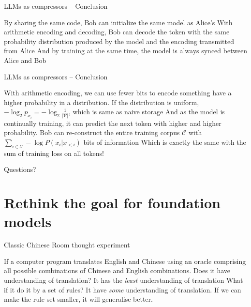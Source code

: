 \documentclass[scheme=plain]{ctexbeamer}
\begin{document}
\begin{frame}{LLMs as compressors -- Conclusion}
  \begin{outline}
    \1 By sharing the same code, Bob can initialize the same model as Alice's
    \1 With arithmetic encoding and decoding, Bob can decode the token with the same probability distribution produced by the model and the encoding transmitted from Alice
    \1 And by training at the same time, the model is always synced between Alice and Bob
  \end{outline}
\end{frame}

\begin{frame}{LLMs as compressors -- Conclusion}
  \begin{outline}
    \1 With arithmetic encoding, we can use fewer bits to encode something have a higher probability in a distribution.
      \2 If the distribution is uniform, $-\log_2 p_{x_i} = -\log_2 \frac{1}{|\mathcal{V}|}$, which is same as naive storage
      \2 And as the model is continually training, it can predict the next token with higher and higher probability.
    \1 Bob can re-construct the entire training corpus $\mathcal{C}$ with $\sum_{i \in \mathcal{C}} - \log P(x_i | x_{<i}) $ bits of information
      \2 Which is exactly the same with the sum of training loss on all tokens!
  \end{outline}
\end{frame}

\begin{frame}[standout]
  Questions?
\end{frame}

\section[LLM, compression and AGI]{Rethink the goal for foundation models}

\begin{frame}{Classic Chinese Room thought experiment}
  \begin{outline}
    \1 If a computer program translates English and Chinese using an oracle comprising all possible combinations of Chinese and English combinations.
      \2 Does it have understanding of translation?
    \pause
      \2 It has the \emph{least} understanding of translation
    \pause
    \1 What if it do it by a set of rules?
      \2 It have \emph{some} understanding of translation.
    \pause
    \1 If we can make the rule set smaller, it will generalise better.
  \end{outline}
\end{frame}
\end{document}
